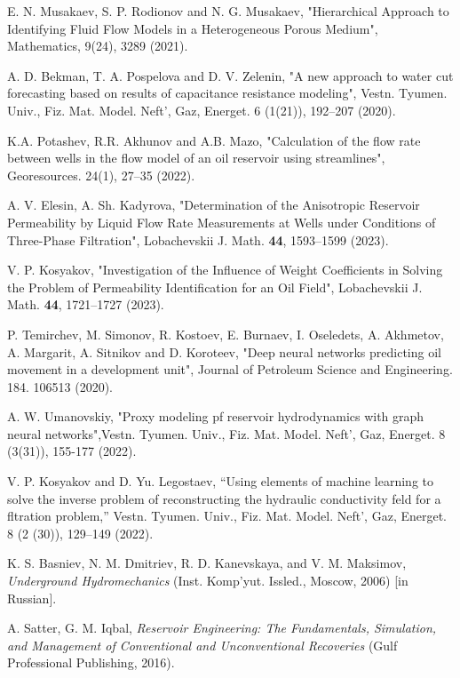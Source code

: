 \documentclass{article}
\begin{document}
 \begin{thebibliography}{20}
	
 E. N. Musakaev, S. P. Rodionov and N. G. Musakaev, "Hierarchical Approach to Identifying Fluid Flow Models in a Heterogeneous Porous Medium", Mathematics, 9(24), 3289 (2021).

 A. D. Bekman, T. A. Pospelova and D. V. Zelenin,  "A new approach to water cut forecasting based on results of capacitance resistance modeling", Vestn. Tyumen. Univ., Fiz. Mat. Model. Neft’, Gaz, Energet. 6 (1(21)), 192–207 (2020).

 K.A. Potashev, R.R. Akhunov and  A.B. Mazo, "Calculation of the flow rate between wells in the flow model of an oil reservoir using streamlines", Georesources. 24(1), 27–35 (2022).

 A. V. Elesin, A. Sh. Kadyrova, "Determination of the Anisotropic Reservoir Permeability by Liquid Flow Rate Measurements at Wells under Conditions of Three-Phase Filtration", Lobachevskii J. Math.
{\bf 44}, 1593--1599 (2023).

 V. P. Kosyakov, "Investigation of the Influence of Weight Coefficients in Solving the Problem of Permeability Identification for an Oil Field", Lobachevskii J. Math.
{\bf 44}, 1721--1727 (2023).

  P. Temirchev, M. Simonov, R. Kostoev, E. Burnaev, I. Oseledets, A. Akhmetov, A. Margarit, A. Sitnikov and D. Koroteev, "Deep neural networks predicting oil movement in a development unit", Journal of Petroleum Science and Engineering. 184. 106513 (2020).

 A. W. Umanovskiy, "Proxy modeling pf reservoir hydrodynamics with graph neural networks",Vestn. Tyumen. Univ., Fiz. Mat. Model. Neft’, Gaz, Energet. 8 (3(31)), 155-177 (2022).

 V. P. Kosyakov and D. Yu. Legostaev, “Using elements of machine learning to solve the inverse problem of reconstructing the hydraulic conductivity feld for a fltration problem,” Vestn. Tyumen. Univ., Fiz. Mat. Model. Neft’, Gaz, Energet. 8 (2 (30)), 129–149 (2022).

K. S. Basniev, N. M. Dmitriev, R. D. Kanevskaya, and V. M. Maksimov, \textit{Underground Hydromechanics} (Inst. Komp'yut. Issled., Moscow, 2006) [in Russian].

A. Satter, G. M. Iqbal, \textit{Reservoir Engineering: The Fundamentals, Simulation, and Management of Conventional and Unconventional Recoveries} (Gulf Professional Publishing, 2016).


\end{thebibliography}
\end{document}

